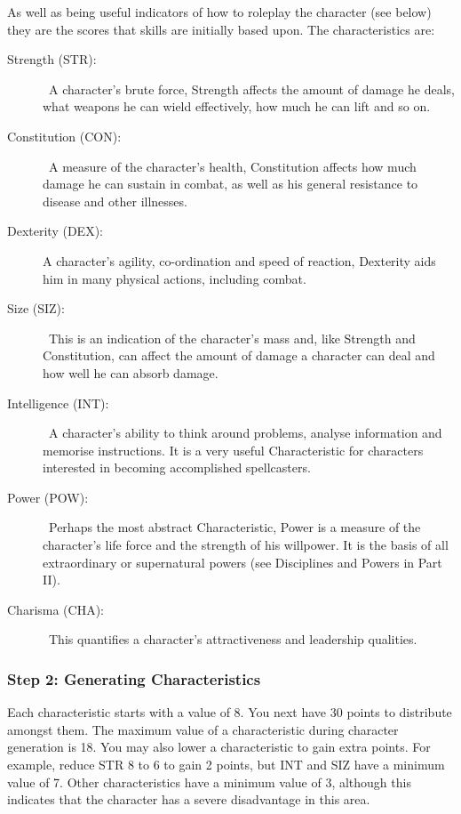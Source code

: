 As well as being useful indicators of how to roleplay the character (see below) they are the scores that skills are initially based upon. The characteristics are:

\begin{description}
	\item[Strength (STR):] A character’s brute force, Strength affects the amount of damage he deals, what weapons he can wield effectively, how much he can lift and so on. 
	\item[Constitution (CON):] A measure of the character’s health, Constitution affects how much damage he can sustain in combat, as well as his general resistance to disease and other illnesses.
	\item[Dexterity (DEX):] A character’s agility, co-ordination and speed of reaction, Dexterity aids him in many physical actions, including combat. 
	\item[Size (SIZ):] This is an indication of the character’s mass and, like Strength and Constitution, can affect the amount of damage a character can deal and how well he can absorb damage.
	\item[Intelligence (INT):] A character’s ability to think around problems, analyse information and memorise instructions. It is a very useful Characteristic for characters interested in becoming accomplished spellcasters. 
	\item[Power (POW):] Perhaps the most abstract Characteristic, Power is a measure of the character’s life force and the strength of his willpower. It is the basis of all extraordinary or supernatural powers (see Disciplines and Powers in Part II).
	\item[Charisma (CHA):] This quantifies a character’s attractiveness and leadership qualities. 
\end{description}


\subsubsection{Step 2: Generating Characteristics}
Each characteristic starts with a value of 8.  You next have 30 points to distribute amongst them. The maximum value of a characteristic during character generation is 18. You may also lower a characteristic to gain extra points. For example, reduce STR 8 to 6 to gain 2 points, but INT and SIZ have a minimum value of 7. Other characteristics have a minimum value of 3, although this indicates that the character has a severe disadvantage in this area. 

